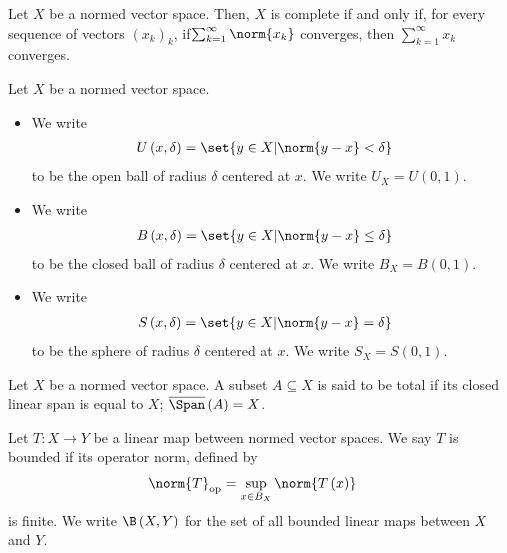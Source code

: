 \begin{theorem}
  Let $X$ be a normed vector space. Then, $X$ is complete if and only if, for every sequence of vectors $\left(x_k\right)_k$, if$\sum_{k=1}^{\infty}\norm{x_k}$ converges, then $\sum_{k=1}^{\infty}x_k$ converges.
\end{theorem}
\begin{definition}\label{def:open_closed_balls}
  Let $X$ be a normed vector space.
  \begin{itemize}
    \item We write 
      \begin{align*}
        U\left(x,\delta\right) &= \set{y\in X | \norm{y-x} < \delta}
      \end{align*}
      to be the open ball of radius $\delta$ centered at $x$. We write $U_X = U\left(0,1\right)$.
    \item We write
      \begin{align*}
        B\left(x,\delta\right) &= \set{y\in X | \norm{y-x} \leq \delta}
      \end{align*}
      to be the closed ball of radius $\delta$ centered at $x$. We write $B_X = B\left(0,1\right)$.
    \item We write
      \begin{align*}
        S\left(x,\delta\right) &= \set{y\in X | \norm{y-x} = \delta}
      \end{align*}
      to be the sphere of radius $\delta$ centered at $x$. We write $S_X = S\left(0,1\right)$.
  \end{itemize}
\end{definition}
\begin{definition}\label{def:total_subset}
  Let $X$ be a normed vector space. A subset $A\subseteq X$ is said to be total if its closed linear span is equal to $X$; $\overline{\Span}\left(A\right) = X$.
\end{definition}
\begin{definition}
  Let $T\colon X\rightarrow Y$ be a linear map between normed vector spaces. We say $T$ is bounded if its operator norm, defined by
  \begin{align*}
    \norm{T}_{\op} &= \sup_{x\in B_X}\norm{T\left(x\right)}
  \end{align*}
  is finite. We write $\B\left(X,Y\right)$ for the set of all bounded linear maps between $X$ and $Y$.
\end{definition}
